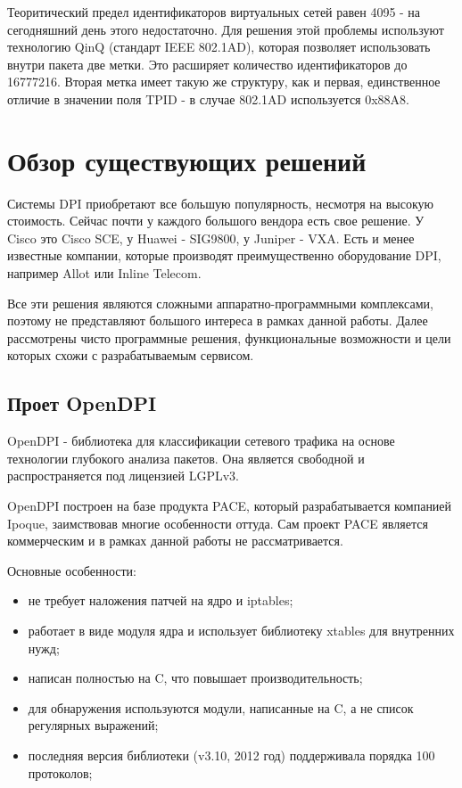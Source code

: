 Теоритический предел идентификаторов виртуальных сетей равен 4095 - на сегодняшний день этого недостаточно. Для решения этой проблемы используют технологию QinQ (стандарт IEEE 802.1AD), которая позволяет использовать внутри пакета две метки. Это расширяет количество идентификаторов до 16777216. Вторая метка имеет такую же структуру, как и первая, единственное отличие в значении поля TPID - в случае 802.1AD используется 0x88A8.


\section{Обзор существующих решений}
Системы DPI приобретают все большую популярность, несмотря на высокую стоимость. Сейчас почти у каждого большого вендора есть свое решение. У Cisco это Cisco SCE, у Huawei - SIG9800, у Juniper - VXA. Есть и менее известные компании, которые производят преимущественно оборудование DPI, например Allot или Inline Telecom.

Все эти решения являются сложными аппаратно-программными комплексами, поэтому не представляют большого интереса в рамках данной работы. Далее рассмотрены чисто программные решения, функциональные возможности  и цели которых схожи с разрабатываемым сервисом.
\subsection{Проет OpenDPI}
OpenDPI - библиотека для классификации сетевого трафика на основе технологии глубокого анализа пакетов. Она является свободной и распространяется под лицензией LGPLv3.

OpenDPI построен на базе продукта PACE, который разрабатывается компанией Ipoque, заимствовав многие особенности оттуда. Сам проект PACE является коммерческим и в рамках данной работы не рассматривается.

Основные особенности:
\begin{itemize}
\item не требует наложения патчей на ядро и iptables;
\item работает в виде модуля ядра и использует библиотеку xtables для внутренних нужд;
\item написан полностью на C, что повышает производительность;
\item для обнаружения используются модули, написанные на C, а не список регулярных выражений;
\item последняя версия библиотеки (v3.10, 2012 год) поддерживала порядка 100 протоколов;
\end{itemize}

